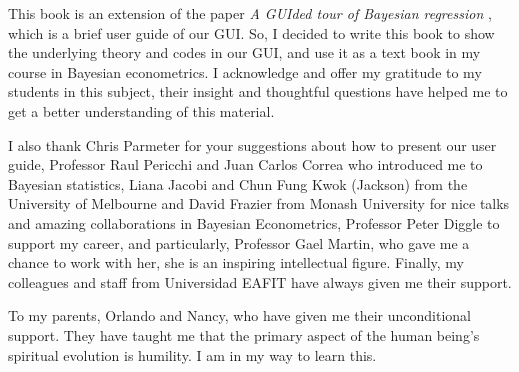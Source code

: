 This book is an extension of the paper \textit{A GUIded tour of Bayesian regression} \cite{Ramirez2020}, which is a brief user guide of our GUI. So, I decided to write this book to show the underlying theory and codes in our GUI, and use it as a text book in my course in Bayesian econometrics. I acknowledge and offer my gratitude to my students in this subject, their insight and thoughtful questions have helped me to get a better understanding of this material.   

I also thank Chris Parmeter for your suggestions about how to present our user guide, Professor Raul Pericchi and Juan Carlos Correa who introduced me to Bayesian statistics, Liana Jacobi and Chun Fung Kwok (Jackson) from the University of Melbourne and David Frazier from Monash University for nice talks and amazing collaborations in Bayesian Econometrics, Professor Peter Diggle to support my career, and particularly, Professor Gael Martin, who gave me a chance to work with her, she is an inspiring intellectual figure. Finally, my colleagues and staff from Universidad EAFIT have always given me their support.

To my parents, Orlando and Nancy, who have given me their unconditional support. They have taught me that the primary aspect of the human being's spiritual evolution is humility. I am in my way to learn this.


